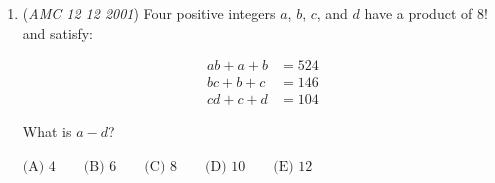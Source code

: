 \begin{enumerate}
 



\textbf{Solution 2}

First, we express the coordinates of the midpoints of the four sides.

 Midpoint AB: $(2,5)$

 Midpoint BC: $(3,2)$

 Midpoint CD: $(\frac{a+5}{2},\frac{b+3}{2})$

 Midpoint AD: $(\frac{a+3}{2},\frac{b+9}{2})$

 Because the shape formed is a square, so we know that the distance between all four points are equal.

 Using the distance formula on the two known coordinates, we have: 
 \[d = \sqrt{(x_2 - x_1)^2 + (y_2 - y_1)^2}\]
 \[d = \sqrt{(3 - 2)^2 + (2 -5)^2}\]
 \[d = \sqrt{1 + 9}\]
 \[d = \sqrt{10}\]

 Knowing the side length of the square, we use the coordinates of the midpoints of BC and CD. Substituting the coordinates of these two points, we have: 
 \[\sqrt{10} = \sqrt{(\frac{a+5-6}{2})^2 + (\frac{b+3-4}{2})^2}\]

 Squaring both sides and simplifying:
 \[10 = (\frac{a-1}{2})^2 + (\frac{b-1}{2})^2\]
 \[10 = \frac{(a-1)^2 + (b-1)^2}{4}\]
 \[40 = (a-1)^2 + (b-1)^2\]

 After observation, we see that 40 is the sum of two squares: 4 and 36. It does not matter much to which one is which, so we have the following:
 \[(a-1)^2 = 4\]
 \[(b-1)^2 = 36\]

 Since, the question states that the four points lie in the first quadrant, so $a, b > 0$.

 Then, we have 
 \[a = 3\] 
 \[b = 7\]

 So, $a+b = 3 + 7 = \boxed{10}$.

 


	\item (\textit{AMC 12 12 2001}) Four positive integers $a$, $b$, $c$, and $d$ have a product of $8!$ and satisfy:


 
 \begin{align*} ab + a + b & = 524 \\  bc + b + c & = 146 \\  cd + c + d & = 104 \end{align*}



 What is $a-d$?


 $\text{(A) }4 \qquad \text{(B) }6 \qquad \text{(C) }8 \qquad \text{(D) }10 \qquad \text{(E) }12$


\end{enumerate}
